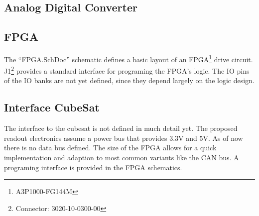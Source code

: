 \subsection{Analog Digital Converter}
\label{sec:adc}


\subsection{FPGA}
\label{sec:FPGA}
The ``FPGA.SchDoc'' schematic defines a basic layout of an FPGA\footnote{A3P1000-FG144M} drive circuit.
J1\footnote{Connector: 3020-10-0300-00} provides a standard interface for programing the FPGA's logic.
The IO pins of the IO banks are not yet defined, since they depend largely on the logic design.


\subsection{Interface CubeSat}
\label{sec:interface_cubesat}
The interface to the cubesat is not defined in much detail yet.
The proposed readout electronics assume a power bus that provides 3.3V and 5V.
As of now there is no data bus defined.
The size of the FPGA allows for a quick implementation and adaption to most common variants like the CAN bus.
A programing interface is provided in the FPGA schematics.
